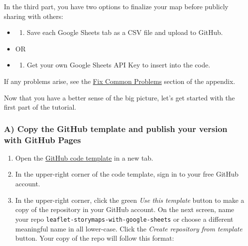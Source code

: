 \documentclass[
  english,
]{book}
\providecommand{\tightlist}{%
  \setlength{\itemsep}{0pt}\setlength{\parskip}{0pt}}
\begin{document}
In the third part, you have two options to finalize your map before publicly sharing with others:

\begin{itemize}
\item
  \begin{enumerate}
  \def\labelenumi{\Alph{enumi})}
  \setcounter{enumi}{6}
  \tightlist
  \item
    Save each Google Sheets tab as a CSV file and upload to GitHub.
  \end{enumerate}
\item
  OR
\item
  \begin{enumerate}
  \def\labelenumi{\Alph{enumi})}
  \setcounter{enumi}{7}
  \tightlist
  \item
    Get your own Google Sheets API Key to insert into the code.
  \end{enumerate}
\end{itemize}

If any problems arise, see the \href{fix.html}{Fix Common Problems} section of the appendix.

Now that you have a better sense of the big picture, let's get started with the first part of the tutorial.

\hypertarget{a-copy-the-github-template-and-publish-your-version-with-github-pages-1}{%
\subsubsection*{A) Copy the GitHub template and publish your version with GitHub Pages}\label{a-copy-the-github-template-and-publish-your-version-with-github-pages-1}}

\begin{enumerate}
\def\labelenumi{\arabic{enumi}.}
\item
  Open the \href{https://github.com/handsondataviz/leaflet-storymaps-with-google-sheets}{GitHub code template} in a new tab.
\item
  In the upper-right corner of the code template, sign in to your free GitHub account.
\item
  In the upper-right corner, click the green \emph{Use this template} button to make a copy of the repository in your GitHub account. On the next screen, name your repo \texttt{leaflet-storymaps-with-google-sheets} or choose a different meaningful name in all lower-case. Click the \emph{Create repository from template} button. Your copy of the repo will follow this format:
\end{enumerate}
\end{document}
